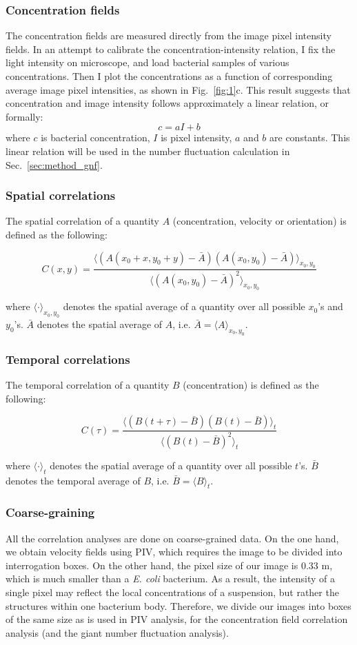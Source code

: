 \documentclass[twocolumn,aps,pre,amsmath,amssymb,floatfix,longbibliography]{revtex4-1}
\begin{document}
\subsubsection{Concentration fields}
The concentration fields are measured directly from the image pixel intensity fields. In an attempt to calibrate the concentration-intensity relation, I fix the light intensity on microscope, and load bacterial samples of various concentrations. Then I plot the concentrations as a function of corresponding average image pixel intensities, as shown in Fig.~\ref{fig:1}c. This result suggests that concentration and image intensity follows approximately a linear relation, or formally:
$$ c = aI + b $$
where $c$ is bacterial concentration, $I$ is pixel intensity, $a$ and $b$ are constants. This linear relation will be used in the number fluctuation calculation in Sec.~\ref{sec:method_gnf}.
\subsubsection{Spatial correlations}

The spatial correlation of a quantity $A$ (concentration, velocity or orientation) is defined as the following:

$$ C(x, y) = \frac{\langle(A(x_0+x, y_0+y)-\bar A)(A(x_0, y_0)-\bar A) \rangle_{x_0, y_0}}{\langle(A(x_0, y_0)-\bar A)^2\rangle_{x_0, y_0}}$$

where $\langle\cdot\rangle_{x_0, y_0}$ denotes the spatial average of a quantity over all possible $x_0$'s and $y_0$'s.  $\bar A$ denotes the spatial average of $A$, i.e. $\bar A=\langle A\rangle_{x_0, y_0}$.

\subsubsection{Temporal correlations}
The temporal correlation of a quantity $B$ (concentration) is defined as the following:

$$ C(\tau) = \frac{\langle (B(t+\tau)-\bar B)(B(t)-\bar B)\rangle_t}{\langle(B(t)-\bar B)^2\rangle_t} $$

where $\langle\cdot\rangle_{t}$ denotes the spatial average of a quantity over all possible $t$'s.  $\bar B$ denotes the temporal average of $B$, i.e. $\bar B=\langle B\rangle_{t}$.

\subsubsection{Coarse-graining}
All the correlation analyses are done on coarse-grained data. On the one hand, we obtain velocity fields using PIV, which requires the image to be divided into interrogation boxes. On the other hand, the pixel size of our image is 0.33 \textmu m, which is much smaller than a \textit{E. coli} bacterium. As a result, the intensity of a single pixel may reflect the local concentrations of a suspension, but rather the structures within one bacterium body. Therefore, we divide our images into boxes of the same size as is used in PIV analysis, for the concentration field correlation analysis (and the giant number fluctuation analysis).
\end{document}
